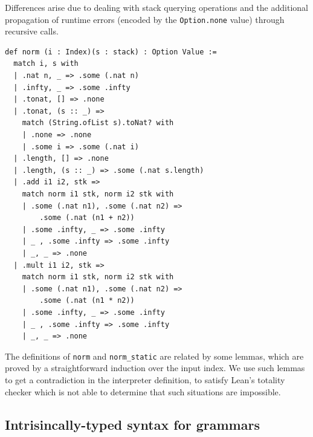 \documentclass[preprint,12pt]{elsarticle}
\theoremstyle{definition}
\begin{document}
Differences arise due to dealing with stack querying operations and the additional propagation
of runtime errors (encoded by the \lstinline|Option.none| value) through recursive calls.
\begin{lstlisting}
def norm (i : Index)(s : stack) : Option Value :=
  match i, s with
  | .nat n, _ => .some (.nat n)
  | .infty, _ => .some .infty
  | .tonat, [] => .none
  | .tonat, (s :: _) =>
    match (String.ofList s).toNat? with
    | .none => .none
    | .some i => .some (.nat i)
  | .length, [] => .none
  | .length, (s :: _) => .some (.nat s.length)
  | .add i1 i2, stk =>
    match norm i1 stk, norm i2 stk with
    | .some (.nat n1), .some (.nat n2) =>
        .some (.nat (n1 + n2))
    | .some .infty, _ => .some .infty
    | _ , .some .infty => .some .infty
    | _, _ => .none
  | .mult i1 i2, stk =>
    match norm i1 stk, norm i2 stk with
    | .some (.nat n1), .some (.nat n2) =>
        .some (.nat (n1 * n2))
    | .some .infty, _ => .some .infty
    | _ , .some .infty => .some .infty
    | _, _ => .none
\end{lstlisting}
The definitions of \lstinline|norm| and \lstinline|norm_static| are related by some
lemmas, which are proved by a straightforward induction over the input index. We use
such lemmas to get a contradiction in the interpreter definition, to satisfy Lean's
totality checker which is not able to determine that such situations are impossible.

\subsection{Intrisincally-typed syntax for grammars}~\label{sec:pest-syntax}
\end{document}
